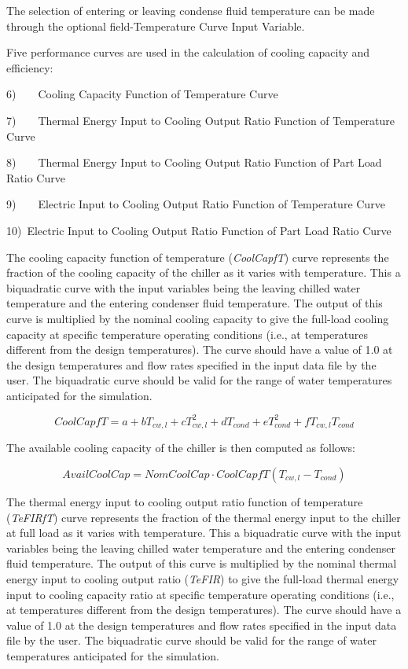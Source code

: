 The selection of entering or leaving condense fluid temperature can be made through the optional field-Temperature Curve Input Variable.

Five performance curves are used in the calculation of cooling capacity and efficiency:

6)~~~~Cooling Capacity Function of Temperature Curve

7)~~~~Thermal Energy Input to Cooling Output Ratio Function of Temperature Curve

8)~~~~Thermal Energy Input to Cooling Output Ratio Function of Part Load Ratio Curve

9)~~~~Electric Input to Cooling Output Ratio Function of Temperature Curve

10)~Electric Input to Cooling Output Ratio Function of Part Load Ratio Curve

The cooling capacity function of temperature (\emph{CoolCapfT}) curve represents the fraction of the cooling capacity of the chiller as it varies with temperature. This a biquadratic curve with the input variables being the leaving chilled water temperature and the entering condenser fluid temperature. The output of this curve is multiplied by the nominal cooling capacity to give the full-load cooling capacity at specific temperature operating conditions (i.e., at temperatures different from the design temperatures). The curve should have a value of 1.0 at the design temperatures and flow rates specified in the input data file by the user. The biquadratic curve should be valid for the range of water temperatures anticipated for the simulation.

\begin{equation}
CoolCapfT = a + b{T_{cw,l}} + cT_{cw,l}^2 + d{T_{cond}} + eT_{cond}^2 + f{T_{cw,l}}{T_{cond}}
\end{equation}

The available cooling capacity of the chiller is then computed as follows:

\begin{equation}
AvailCoolCap = NomCoolCap \cdot CoolCapfT({T_{cw,l}} - {T_{cond}})
\end{equation}

The thermal energy input to cooling output ratio function of temperature (\emph{TeFIRfT}) curve represents the fraction of the thermal energy input to the chiller at full load as it varies with temperature. This a biquadratic curve with the input variables being the leaving chilled water temperature and the entering condenser fluid temperature. The output of this curve is multiplied by the nominal thermal energy input to cooling output ratio (\emph{TeFIR}) to give the full-load thermal energy input to cooling capacity ratio at specific temperature operating conditions (i.e., at temperatures different from the design temperatures). The curve should have a value of 1.0 at the design temperatures and flow rates specified in the input data file by the user. The biquadratic curve should be valid for the range of water temperatures anticipated for the simulation.

